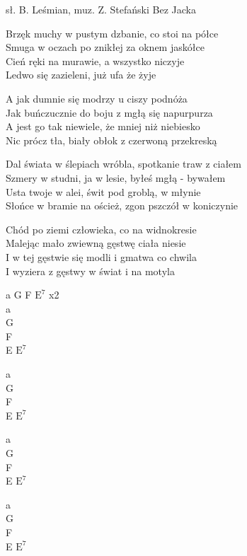 {sł. B. Leśmian, muz. Z. Stefański}
{Bez Jacka}
\begin{text}
\hfill\break
Brzęk muchy w pustym dzbanie, co stoi na półce\\
Smuga w oczach po znikłej za oknem jaskółce\\
Cień ręki na murawie, a wszystko niczyje\\
Ledwo się zazieleni, już ufa że żyje

A jak dumnie się modrzy u ciszy podnóża\\
Jak buńczucznie do boju z mgłą się napurpurza\\
A jest go tak niewiele, że mniej niż niebiesko\\
Nic prócz tła, biały obłok z czerwoną przekreską

Dal świata w ślepiach wróbla, spotkanie traw z ciałem\\
Szmery w studni, ja w lesie, byłeś mgłą - bywałem\\
Usta twoje w alei, świt pod groblą, w młynie\\
Słońce w bramie na oścież, zgon pszczół w koniczynie

Chód po ziemi człowieka, co na widnokresie\\
Malejąc mało zwiewną gęstwę ciała niesie\\
I w tej gęstwie się modli i gmatwa co chwila\\
I wyziera z gęstwy w świat i na motyla
\end{text}
\begin{chord}
    a G F $\mathrm{E^7}$ x2\\
    a\\
    G\\
    F\\
    E $\mathrm{E^7}$

    a\\
    G\\
    F\\
    E $\mathrm{E^7}$

    a\\
    G\\
    F\\
    E $\mathrm{E^7}$

    a\\
    G\\
    F\\
    E $\mathrm{E^7}$
\end{chord}
